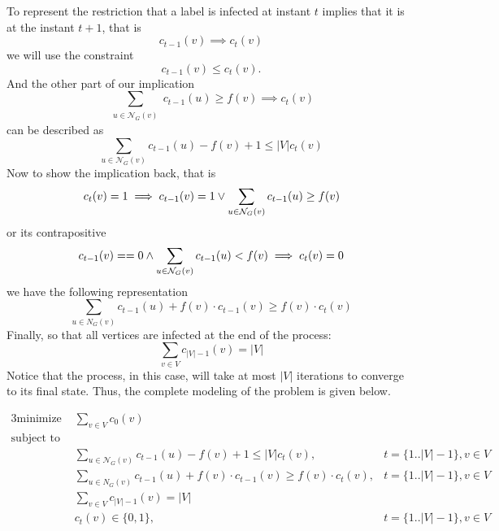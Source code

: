 To represent the restriction that a label is infected at instant $ t $ implies that it is at the instant $ t + 1 $, that is
\begin{equation}
c_{t-1}(v) \implies c_{t}(v)
\end{equation}
we will use the constraint
\begin{equation}
c_{t-1}(v) \leq c_{t}(v).
\end{equation}
And the other part of our implication 
\begin{equation}
\sum_{\substack{ u \in \mathcal{N}_{G}(v) }} c_{t-1}(u) \geq f(v)  \implies c_{t}(v)
\end{equation}
can be described as
\begin{equation}
\sum_{u \in \mathcal{N}_{G}(v)}c_{t-1}(u) - f(v) + 1 \leq |V|c_{t}(v)  
\end{equation}
Now to show the implication back, that is
\begin{equation}
c_{t}(v) = 1 \\ \implies c_{t-1}(v) = 1 \lor	 \sum_{\substack{ u \in \mathcal{N}_{G}(v) }} c_{t-1}(u) \geq f(v)  
\end{equation}
or its contrapositive
\begin{equation}
c_{t-1}(v) == 0  \land \sum_{\substack{ u \in \mathcal{N}_{G}(v) }} c_{t-1}(u) < f(v) \\ \implies c_{t}(v) = 0  
\end{equation}
we have the following representation
\begin{equation}
\sum_{u \in N_{G}(v)}c_{t-1}(u) + f(v) \cdot c_{t-1}(v) \geq f(v) \cdot c_{t}(v) 
\end{equation}
Finally, so that all vertices are infected at the end of the process:
\begin{equation}
\sum_{v \in V}c_{|V| - 1}(v) = |V|   
\end{equation}
Notice that the process, in this case, will take at most $ | V | $ iterations to converge to its final state.
 Thus, the complete modeling of the problem is given below.
 
 
\begin{alignat*}{3}
    \text{minimize }   & \displaystyle\sum\limits_{v \in V} c_{0}(v)\  \\
    \text{subject to} \\ %
&\displaystyle\sum\limits_{u \in \mathcal{N}_{G}(v)}c_{t-1}(u) - f(v) + 1\leq |V|c_{t}(v),  &t=\{1 .. |V|- 1\}, v \in V\\
&\displaystyle\sum\limits_{u \in N_{G}(v)} c_{t-1}(u) + f(v) \cdot c_{t-1}(v) \geq f(v) \cdot  c_{t}(v),  &t=\{1 .. |V|- 1\}, v \in V \\
&\displaystyle\sum\limits_{    v \in V}c_{|V| - 1}(v) = |V|  \\
& c_{t}(v) \in \{0,1\}, &t= \{1 .. |V|- 1\}, v \in V
  \end{alignat*}

